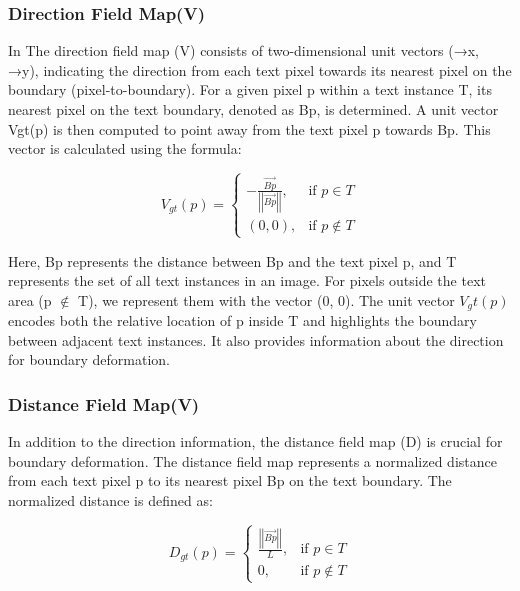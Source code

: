 \subsubsection{Direction Field Map(V)}
In \cite{textfield}\cite{wan2020superbpd}The direction field map (V) consists of two-dimensional unit vectors (→x, →y), indicating the direction from each text pixel towards its nearest pixel on the boundary (pixel-to-boundary). For a given pixel p within a text instance T, its nearest pixel on the text boundary, denoted as Bp, is determined. A unit vector Vgt(p) is then computed to point away from the text pixel p towards Bp. This vector is calculated using the formula:

\begin{equation}
    \label{eqn:Text and non-text separation Method}
 V_{gt}(p) =
\begin{cases}
-\frac{\overrightarrow{Bp}}{\left|\left|\overrightarrow{Bp}\right|\right|}, & \text{if } p \in T \\
(0, 0), & \text{if } p \notin T
\end{cases}
\end{equation}

Here, Bp represents the distance between Bp and the text pixel p, and T represents the set of all text instances in an image. For pixels outside the text area (p $\not\in $ T), we represent them with the vector (0, 0). The unit vector $ V_gt(p) $ encodes both the relative location of p inside T and highlights the boundary between adjacent text instances. It also provides information about the direction for boundary deformation.

\subsubsection{Distance Field Map(V)}
In addition to the direction information, the distance field map (D) is crucial for boundary deformation. The distance field map represents a normalized distance from each text pixel p to its nearest pixel Bp on the text boundary. The normalized distance is defined as:

\begin{equation}
D_{gt}(p) = 
\begin{cases}
\frac{\left|\left|\overrightarrow{Bp}\right|\right|}{L}, & \text{if } p \in T \\
0, & \text{if } p \notin T
\end{cases}
\end{equation}

